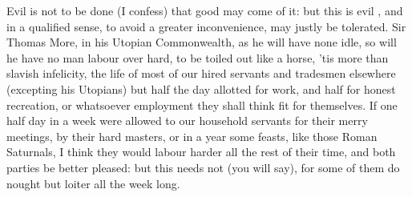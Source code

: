 {Evil is not to be done (I confess) that good may come of it: but this
is evil , and in a qualified sense, to avoid a greater
inconvenience, may justly be tolerated. Sir Thomas More, in his Utopian
Commonwealth, as he will have none idle, so will he have no man
labour over hard, to be toiled out like a horse, 'tis more than slavish
infelicity, the life of most of our hired servants and tradesmen
elsewhere (excepting his Utopians) but half the day allotted for work,
and half for honest recreation, or whatsoever employment they shall
think fit for themselves. If one half day in a week were allowed to our
household servants for their merry meetings, by their hard masters, or
in a year some feasts, like those Roman Saturnals, I think they would
labour harder all the rest of their time, and both parties be better
pleased: but this needs not (you will say), for some of them do nought
but loiter all the week long.

}
